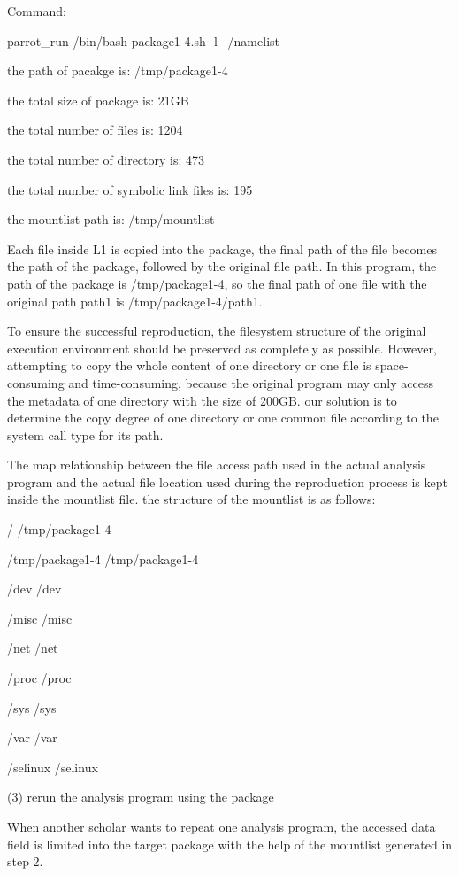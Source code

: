 \documentclass{acm_proc_article-sp}
\begin{document}
Command:

parrot\_run /bin/bash package1-4.sh -l ~/namelist

the path of pacakge is: /tmp/package1-4

the total size of package is: 21GB

the total number of files is: 1204

the total number of directory is: 473

the total number of symbolic link files is: 195

the mountlist path is: /tmp/mountlist

Each file inside L1 is copied into the package, the final path of the file becomes the path of the package, followed by the original file path. In this program, the path of the package is /tmp/package1-4, so the final path of one file with the original path path1 is /tmp/package1-4/path1.

To ensure the successful reproduction, the filesystem structure of the original execution environment should be preserved as completely as possible. However, attempting to copy the whole content of one directory or one file is space-consuming and time-consuming, because the original program may only access the metadata of one directory with the size of 200GB. our solution is to determine the copy degree of one directory or one common file according to the system call type for its path.

The map relationship between the file access path used in the actual analysis program and the actual file location used during the reproduction process is kept inside the mountlist file. the structure of the mountlist is as follows:

/ /tmp/package1-4 

/tmp/package1-4 /tmp/package1-4 

/dev /dev 

/misc /misc 

/net /net 

/proc /proc 

/sys /sys 

/var /var 

/selinux /selinux

(3) rerun the analysis program using the package

When another scholar wants to repeat one analysis program, the accessed data field is limited into the target package with the help of the mountlist generated in step 2. 
\end{document}
